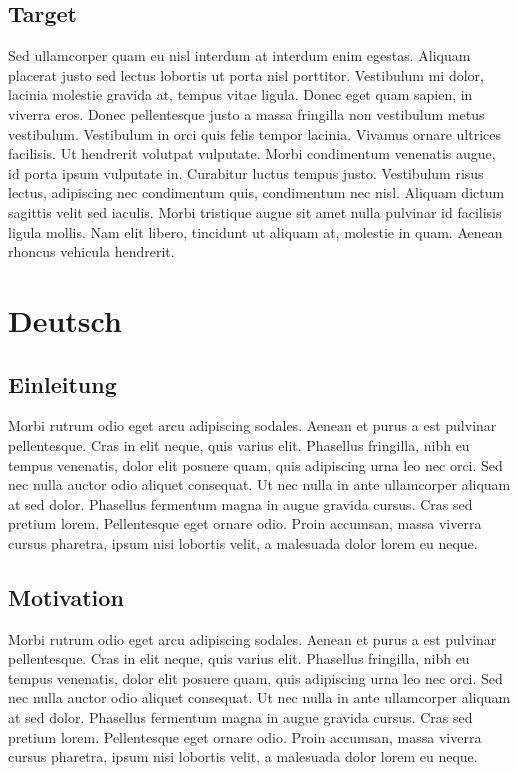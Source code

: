 \subsection{Target}
Sed ullamcorper quam eu nisl interdum at interdum enim egestas. Aliquam placerat justo sed lectus lobortis ut porta nisl porttitor. Vestibulum mi dolor, lacinia molestie gravida at, tempus vitae ligula. Donec eget quam sapien, in viverra eros. Donec pellentesque justo a massa fringilla non vestibulum metus vestibulum. Vestibulum in orci quis felis tempor lacinia. Vivamus ornare ultrices facilisis. Ut hendrerit volutpat vulputate. Morbi condimentum venenatis augue, id porta ipsum vulputate in. Curabitur luctus tempus justo. Vestibulum risus lectus, adipiscing nec condimentum quis, condimentum nec nisl. Aliquam dictum sagittis velit sed iaculis. Morbi tristique augue sit amet nulla pulvinar id facilisis ligula mollis. Nam elit libero, tincidunt ut aliquam at, molestie in quam. Aenean rhoncus vehicula hendrerit.
\section{Deutsch}

\subsection{Einleitung}
Morbi rutrum odio eget arcu adipiscing sodales. Aenean et purus a est pulvinar pellentesque. Cras in elit neque, quis varius elit. Phasellus fringilla, nibh eu tempus venenatis, dolor elit posuere quam, quis adipiscing urna leo nec orci. Sed nec nulla auctor odio aliquet consequat. Ut nec nulla in ante ullamcorper aliquam at sed dolor. Phasellus fermentum magna in augue gravida cursus. Cras sed pretium lorem. Pellentesque eget ornare odio. Proin accumsan, massa viverra cursus pharetra, ipsum nisi lobortis velit, a malesuada dolor lorem eu neque.
\subsection{Motivation}

Morbi rutrum odio eget arcu adipiscing sodales. Aenean et purus a est pulvinar pellentesque. Cras in elit neque, quis varius elit. Phasellus fringilla, nibh eu tempus venenatis, dolor elit posuere quam, quis adipiscing urna leo nec orci. Sed nec nulla auctor odio aliquet consequat. Ut nec nulla in ante ullamcorper aliquam at sed dolor. Phasellus fermentum magna in augue gravida cursus. Cras sed pretium lorem. Pellentesque eget ornare odio. Proin accumsan, massa viverra cursus pharetra, ipsum nisi lobortis velit, a malesuada dolor lorem eu neque.
